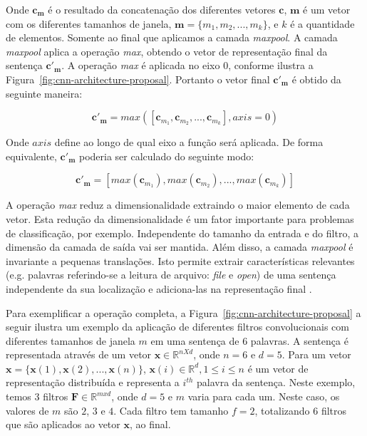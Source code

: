 Onde $\bm{c}_{\bm{m}}$ é o resultado da concatenação dos diferentes vetores $\bm{c}$, $\bm{m}$ é um vetor com os diferentes tamanhos de janela, $\bm{m} = \{m_1, m_2, . . ., m_{k}\}$, e $k$ é a quantidade de elementos. Somente ao final que aplicamos a camada \textit{maxpool}. A camada \textit{maxpool} aplica a operação \textit{max}, obtendo o vetor de representação final da sentença $\bm{c'}_{\bm{m}}$. A operação \textit{max} é aplicada no eixo $0$, conforme ilustra a Figura~\ref{fig:cnn-architecture-proposal}. Portanto o vetor final $\bm{c'}_{\bm{m}}$ é obtido da seguinte maneira:

\begin{equation}
    \bm{c'}_{\bm{m}} = max\left(\left[\bm{c}_{m_1}, \bm{c}_{m_2}, . . ., \bm{c}_{m_k}\right], axis = 0\right)
\end{equation}

Onde $axis$ define ao longo de qual eixo a função será aplicada. De forma equivalente, $\bm{c'}_{\bm{m}}$ poderia ser calculado do seguinte modo:

\begin{equation}\label{eq:final_representation_cnn}
    \bm{c'}_{\bm{m}} = \left[max(\bm{c}_{m_1}), max(\bm{c}_{m_2}), . . ., max(\bm{c}_{m_k})\right]
\end{equation}

A operação \textit{max} reduz a dimensionalidade extraindo o maior elemento de cada vetor. Esta redução da dimensionalidade é um fator importante para problemas de classificação, por exemplo. Independente do tamanho da entrada e do filtro, a dimensão da camada de saída vai ser mantida. Além disso, a camada \textit{maxpool} é invariante a pequenas translações. Isto permite extrair características relevantes (e.g. palavras referindo-se a leitura de arquivo: \emph{file} e \emph{open}) de uma sentença independente da sua localização e adiciona-las na representação final \citep{tom-young:trends-deep-learning-nlp}.

Para exemplificar a operação completa, a Figura~\ref{fig:cnn-architecture-proposal} a seguir ilustra um exemplo da aplicação de diferentes filtros convolucionais com diferentes tamanhos de janela $m$ em uma sentença de 6 palavras. A sentença é representada através de um vetor $\bm{x} \in \mathbb{R}^{n X d}$, onde $n = 6$ e $d = 5$. Para um vetor $\bm{x} = \{\bm{x}(1), \bm{x}(2), . . ., \bm{x}(n) \}$, $\bm{x}(i) \in \mathbb{R}^{d}, 1 \leq i \leq n$ é um vetor de representação distribuída e representa a $i^{th}$ palavra da sentença. Neste exemplo, temos 3 filtros $\bm{F} \in \mathbb{R}^{m x d}$, onde $d = 5$ e $m$ varia para cada um. Neste caso, os valores de $m$ são $2$, $3$ e $4$. Cada filtro tem tamanho $f = 2$, totalizando 6 filtros que são aplicados ao vetor $\bm{x}$, ao final.

